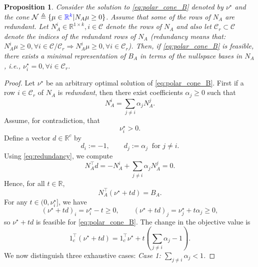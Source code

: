 \documentclass[letterpaper, 10 pt, conference]{ieeeconf}  %
\newtheorem{proposition}{\textbf{Proposition}}
\begin{document}
{\color{blue}
\begin{proposition}\label{prop:minimal_sol}
        Consider the solution to \eqref{eq:polar_cone_B} denoted by $\nu^\star$ and the cone $\mathcal{N} \triangleq \{ \mu \in {\color{blue}\mathbb{R}^k} | N_A \mu \geq 0\}$. Assume that some of the rows of $N_A$ are redundant. Let $N_A^i \in \mathbb{R}^{1\times k}, i\in \mathcal{C}$ denote the rows of $N_A$ and also let $\mathcal{C}_r \subset \mathcal{C}$ denote the indices of the redundant rows of $N_A$ (redundancy means that: $N_A^i \mu \geq 0, \forall i\in\mathcal{C}/\mathcal{C}_r \Longrightarrow N_A^i \mu \geq 0, \forall i\in\mathcal{C}_r$). Then, if \eqref{eq:polar_cone_B} is feasible, there exists a minimal representation of $B_A$ in terms of the nullspace bases in $N_A$, i.e., $\nu^\star_i = 0, \forall i\in\mathcal{C}_r$.
\end{proposition}
\begin{proof}
Let $\nu^\star$ be an arbitrary optimal solution of \eqref{eq:polar_cone_B}. First if a row $i\in\mathcal{C}_r$ of $N_A$ is \emph{redundant}, then there exist coefficients
$\alpha_j \ge 0$ such that
\begin{equation}\label{eq:redundancy}
N_{A}^i = \sum_{j\neq i} \alpha_j N_{A}^j.
\end{equation}
Assume, for contradiction, that
\begin{equation}\label{eq:positive_weight}
\nu^\star_i > 0.
\end{equation}
Define a vector $d \in \mathbb{R}^c$ by
\begin{equation}\label{eq:d_def}
d_i := -1,
\qquad
d_j := \alpha_j \ \text{ for } j\neq i.
\end{equation}
Using \eqref{eq:redundancy}, we compute
\[
N_A^\top d
= -N_{A}^i + \sum_{j\neq i} \alpha_j N_{A}^j
= 0.
\]
Hence, for all $t\in\mathbb{R}$,
\begin{equation}\label{eq:feasible_ray}
N_A^\top(\nu^\star + t d) = B_A.
\end{equation}
For any $t \in (0,\nu^\star_i]$, we have
\[
(\nu^\star + t d)_i = \nu^\star_i - t \ge 0,
\qquad
(\nu^\star + t d)_j = \nu^\star_j + t\alpha_j \ge 0,
\]
so $\nu^\star + t d$ is feasible for \eqref{eq:polar_cone_B}.
The change in the objective value is
\begin{equation}\label{eq:objective_change}
1_c^\top(\nu^\star + t d)
= 1_c^\top \nu^\star
+ t\left(\sum_{j\neq i} \alpha_j - 1\right).
\end{equation}
We now distinguish three exhaustive cases:
\noindent\emph{Case 1: $\sum_{j\neq i}\alpha_j < 1$.}

\end{proof}}
\end{document}

